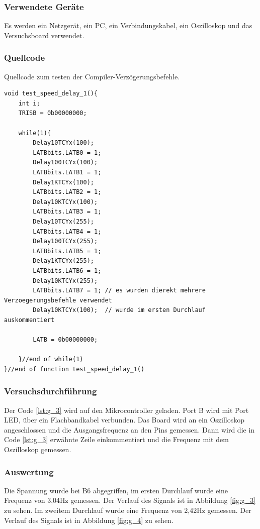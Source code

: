 \documentclass[12pt,a4paper]{article}
\begin{document}
\subsubsection*{Verwendete Geräte}

Es werden ein Netzgerät, ein PC, ein Verbindungskabel, ein Oszilloskop und das Versuchsboard verwendet.

\subsubsection*{Quellcode}

Quellcode zum testen der Compiler-Verzögerungsbefehle.

\lstset{language=C, basicstyle=\tiny}
\begin{lstlisting}[caption = {Geschwindigkeitstest mit Compiler-Verzögerungsbefehlen}, label=lst:g_3,captionpos=b]
void test_speed_delay_1(){
	int i;
	TRISB = 0b00000000;
	
	while(1){
		Delay10TCYx(100);
		LATBbits.LATB0 = 1;
		Delay100TCYx(100);
		LATBbits.LATB1 = 1;
		Delay1KTCYx(100);
		LATBbits.LATB2 = 1;
		Delay10KTCYx(100);
		LATBbits.LATB3 = 1;
		Delay10TCYx(255);
		LATBbits.LATB4 = 1;
		Delay100TCYx(255);
		LATBbits.LATB5 = 1;
		Delay1KTCYx(255);
		LATBbits.LATB6 = 1;
		Delay10KTCYx(255);
		LATBbits.LATB7 = 1;	// es wurden dierekt mehrere Verzoegerungsbefehle verwendet
		Delay10KTCYx(100);	// wurde im ersten Durchlauf auskommentiert
		
		LATB = 0b00000000;
		
	}//end of while(1)
}//end of function test_speed_delay_1()
\end{lstlisting}


\subsubsection*{Versuchsdurchführung}

Der Code \ref{lst:g_3} wird auf den Mikrocontroller geladen. Port B wird mit Port LED, über ein Flachbandkabel verbunden. Das Board wird an ein Oszilloskop angeschlossen und die Ausgangsfrequenz an den Pins gemessen. Dann wird die in Code \ref{lst:g_3} erwähnte Zeile einkommentiert und die Frequenz mit dem  Oszilloskop gemessen.


\subsubsection*{Auswertung}

Die Spannung wurde bei B6 abgegriffen, im ersten Durchlauf wurde eine Frequenz von 3,04Hz gemessen. Der Verlauf des Signals ist in Abbildung \ref{fig:g_3} zu sehen. Im zweitem Durchlauf wurde eine Frequenz von 2,42Hz gemessen. Der Verlauf des Signals ist in Abbildung \ref{fig:g_4} zu sehen.
\end{document}
